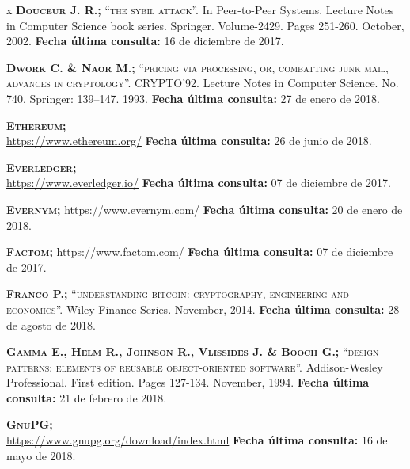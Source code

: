 \begin{thebibliography} {x}
	 \textsc{\textbf{Douceur J. R.; }} \textsc{“the sybil attack”.} In Peer-to-Peer Systems. Lecture Notes in Computer Science book series. Springer. Volume-2429. Pages 251-260. October, 2002.
	\newline \textbf{Fecha última consulta:} 16 de diciembre de 2017.

	 \textsc{\textbf{Dwork C. \& Naor M.; }}\textsc{“pricing via processing, or, combatting junk mail, advances in cryptology”.} CRYPTO’92. Lecture Notes in Computer Science. No. 740. Springer: 139–147. 1993. 
	\newline \textbf{Fecha última consulta:} 27 de enero de 2018.
	
	 \textsc{\textbf{Ethereum; }} \\
	\url{https://www.ethereum.org/}
	\newline \textbf{Fecha última consulta:} 26 de junio de 2018.
	
	 \textsc{\textbf{Everledger; }} \\
	\url{https://www.everledger.io/}
	\newline \textbf{Fecha última consulta:} 07 de diciembre de 2017.
		
	 \textsc{\textbf{Evernym; }} 
	\url{https://www.evernym.com/}
	\newline \textbf{Fecha última consulta:} 20 de enero de 2018.	
	
	 \textsc{\textbf{Factom; }} 
	\url{https://www.factom.com/}
	\newline \textbf{Fecha última consulta:} 07 de diciembre de 2017.
		
	 \textsc{\textbf{Franco P.; }}\textsc{“understanding bitcoin: cryptography, engineering and economics”.} Wiley Finance Series. November, 2014. 
	\newline \textbf{Fecha última consulta:} 28 de agosto de 2018.
		
	 \textsc{\textbf{Gamma E., Helm R., Johnson R., Vlissides J. \& Booch G.; }}\textsc{“design patterns: elements of reusable object-oriented software”.} Addison-Wesley Professional. First edition. Pages 127-134. November, 1994.
	\newline \textbf{Fecha última consulta:} 21 de febrero de 2018.
		
	 \textsc{\textbf{GnuPG; }} \\ 
	\url{https://www.gnupg.org/download/index.html}
	\newline \textbf{Fecha última consulta:} 16 de mayo de 2018.
				

\end{thebibliography}
